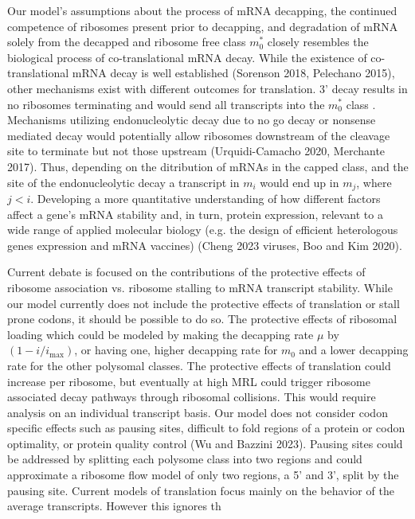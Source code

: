 \documentclass[review]{elsarticle}
\newcommand{\imax}{\ensuremath{{i_{\max}}}\xspace}
\begin{document}
Our model's assumptions about the process of mRNA decapping, the continued competence of ribosomes present prior to decapping, and degradation of mRNA solely from the decapped and ribosome free class $m_0^*$  closely resembles the biological process of co-translational mRNA decay. While the existence of co-translational mRNA decay is well established (Sorenson 2018, Pelechano 2015), other mechanisms exist with different outcomes for translation. 3' decay results in no ribosomes terminating and would send all transcripts into the $m_0^*$ class . Mechanisms utilizing endonucleolytic decay due to no go decay or nonsense mediated decay would potentially allow ribosomes downstream of the cleavage site to terminate but not those upstream (Urquidi-Camacho 2020, Merchante 2017). Thus, depending on the ditribution of mRNAs in the capped class, and the site of the endonucleolytic decay a transcript in $m_i$ would end up in $m_{j}$, where $j < i$.
Developing a more quantitative understanding of how different factors affect a gene's mRNA stability and, in turn, protein expression, relevant to a wide range of applied molecular biology (e.g. the design of efficient heterologous genes expression and mRNA vaccines) (Cheng 2023 viruses, Boo and Kim 2020).

Current debate is focused on the contributions of the protective effects of ribosome association vs. ribosome stalling to mRNA transcript stability.
While our model currently does not include the protective effects of translation or stall prone codons, it should be possible to do so.
The protective effects of ribosomal loading which could be modeled by making the decapping rate $\mu $ by $(1-i/\imax)$, or having one, higher decapping rate for $m_0$ and a lower decapping rate for the other polysomal classes.
The protective effects of translation could increase per ribosome, but eventually at high MRL could trigger ribosome associated decay pathways through ribosomal collisions. This would require analysis on an individual transcript basis.
Our model does not consider codon specific effects such as pausing sites, difficult to fold regions of a protein or codon optimality, or protein quality control (Wu and Bazzini 2023).
Pausing sites could be addressed by splitting each polysome class into two regions and could approximate a ribosome flow model of only two regions, a 5' and 3', split by the pausing site. Current models of translation focus mainly on the behavior of the average transcripts. However this ignores th
\end{document}
